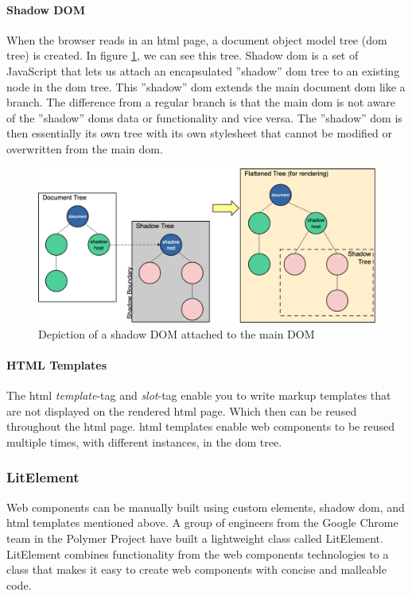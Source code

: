 \paragraph{Shadow DOM}%
\label{ssub:Shadow DOM}
When the browser reads in an \acrshort{html} page, a document object model tree (\acrshort{dom} tree) is created.  In figure \ref{fig:shadow}, we can see this tree. Shadow \acrshort{dom} is a set of JavaScript  that lets us attach an encapsulated ''shadow'' \acrshort{dom} tree to an existing node in the \acrshort{dom} tree. This ''shadow'' \acrshort{dom} extends the main document \acrshort{dom} like a branch. The difference from a regular branch is that the main \acrshort{dom} is not aware of the ''shadow'' \acrshort{dom}s data or functionality and vice versa. The ''shadow'' \acrshort{dom} is then essentially its own tree with its own stylesheet that cannot be modified or overwritten from the main \acrshort{dom}.\\
\begin{figure}[H]
  \centering
  \includegraphics[width=0.8\linewidth]{images/shadow.png}
  \caption{Depiction of a shadow DOM attached to the main DOM}%
  \label{fig:shadow}
\end{figure}




\paragraph{HTML Templates}%
\label{ssub:HMTL Templates}
The \acrshort{html} \textit{template}-tag and \textit{slot}-tag enable you to write markup templates that are not displayed on the rendered \acrshort{html} page. Which then can be reused throughout the \acrshort{html} page. \acrshort{html} templates enable web components to be reused multiple times, with different instances, in the \acrshort{dom} tree.

\subsubsection{LitElement}%
\label{ssub:LitElement}
Web components can be manually built using custom elements, shadow \acrshort{dom}, and \acrshort{html} templates mentioned above. A group of engineers from the Google Chrome team in the Polymer Project \cite{polymerPolymerProject} have built a lightweight class called LitElement. LitElement combines functionality from the web components technologies to a class that makes it easy to create web components with concise and malleable code.


